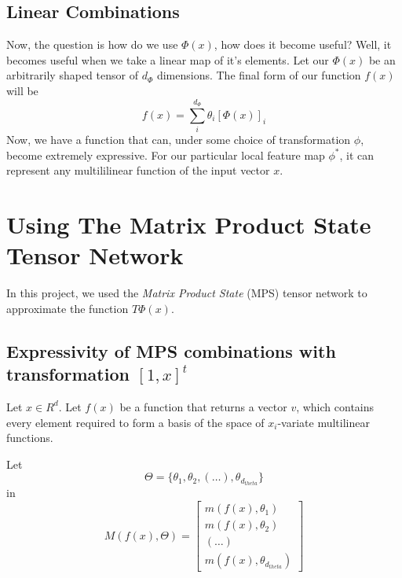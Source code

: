 \documentclass[11pt]{article}
\begin{document}
\subsection{Linear Combinations}
Now, the question is how do we use $\Phi(x)$, how does it become useful? 
Well, it becomes useful when we take a linear map of it's elements. Let our $\Phi(x)$ be an 
arbitrarily shaped tensor of $d_{\Phi}$ dimensions. The final form of our 
function $f(x)$ will be
\begin{equation}
    f(x) = \sum_{i}^{d_{\Phi}} \theta_i [\Phi(x)]_i
\end{equation}
Now, we have a function that can, under some choice of transformation
$\phi$, become extremely expressive. For our particular local feature map 
$\phi^*$, it can represent any multililinear function  of the input vector $x$. 

\section{Using The Matrix Product State Tensor Network}
In this project, we used the {\it Matrix Product State} (MPS) tensor network to 
approximate the function $T  \Phi(x)$.
\subsection{}



\subsection{Expressivity of MPS combinations with transformation $[1,x]^t$}
Let $x \in R^d$.
Let $f(x)$ be a function that returns a vector $v$, which contains every
element required to form a basis of the space of $x_i$-variate multilinear functions.

Let 
\begin{equation}
    \Theta = \{ \theta_1, \theta_2, (\dots), \theta_{d_{theta}} \}
\end{equation}
in
\begin{equation}
    M(f(x), \Theta)
    = 
    \begin{bmatrix}
        m(f(x), \theta_1) \\
        m(f(x), \theta_2) \\
        (\dots) \\
        m(f(x), \theta_{d_{theta}}) 
    \end{bmatrix}
\end{equation}
\end{document}
